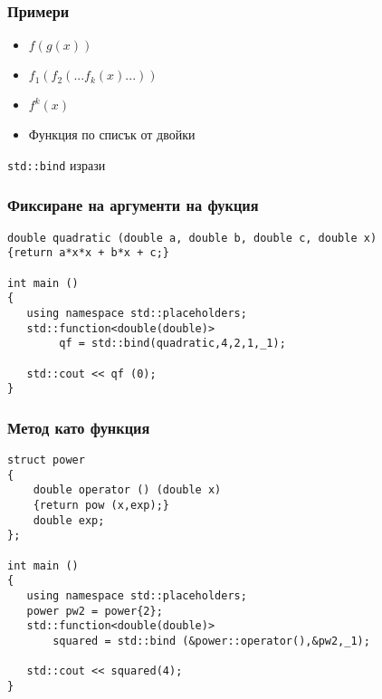 \documentclass{beamer}
\begin{document}
\begin{frame}[fragile]
    \frametitle{Примери}
    
\begin{itemize} 
    \item $f(g(x))$
    \item $f_1(f_2(...f_k(x)...))$
    \item $f^k(x)$
    \item Функция по списък от двойки
\end{itemize}

\end{frame}

\begin{frame}
    \centerline{\texttt{std::bind} изрази}
\end{frame}


\begin{frame}[fragile]
    \frametitle{Фиксиране на аргументи на фукция}
    
\begin{lstlisting}[basicstyle=\small]
double quadratic (double a, double b, double c, double x)
{return a*x*x + b*x + c;}

int main ()
{
   using namespace std::placeholders; 
   std::function<double(double)> 
        qf = std::bind(quadratic,4,2,1,_1);

   std::cout << qf (0);
}

\end{lstlisting}
\end{frame}


\begin{frame}[fragile]
    \frametitle{Метод като функция}
    
\begin{lstlisting}[basicstyle=\small]
struct power
{
    double operator () (double x)
    {return pow (x,exp);}
    double exp;
};
    
int main ()
{
   using namespace std::placeholders; 
   power pw2 = power{2};
   std::function<double(double)> 
       squared = std::bind (&power::operator(),&pw2,_1);

   std::cout << squared(4);
}

\end{lstlisting}
\end{frame}
\end{document}
